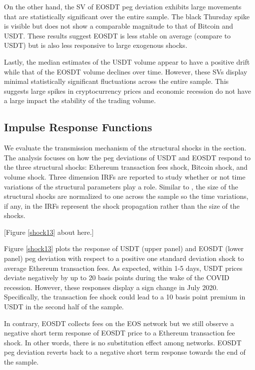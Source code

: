 \documentclass[12pt]{article}
\begin{document}
On the other hand, the SV of EOSDT peg deviation exhibits large movements that are statistically significant over the entire sample. The black Thursday spike is visible but does not show a comparable magnitude to that of Bitcoin and USDT. These results suggest EOSDT is less stable on average (compare to USDT) but is also less responsive to large exogenous shocks. 

Lastly, the median estimates of the USDT volume appear to have a positive drift while that of the EOSDT volume declines over time. However, these SVs display minimal statistically significant fluctuations across the entire sample. This suggests large spikes in cryptocurrency prices and economic recession do not have a large impact the stability of the trading volume. 



\subsection{Impulse Response Functions}
We evaluate the transmission mechanism of the structural shocks in the section. The analysis focuses on how the peg deviations of USDT and EOSDT respond to the three structural shocks: Ethereum transaction fees shock, Bitcoin shock, and volume shock. Three dimension IRFs are reported to study whether or not time variations of the structural parameters play a role. Similar to \cite{cfp}, the size of the structural shocks are normalized to one across the sample so the time variations, if any, in the IRFs represent the shock propagation rather than the size of the shocks. 


\begin{center}
	[Figure \ref{shock13} about here.]
\end{center}

Figure \ref{shock13} plots the response of USDT (upper panel) and EOSDT (lower panel) peg deviation with respect to a positive one standard deviation shock to average Ethereum transaction fees. As expected, within 1-5 days, USDT prices deviate negatively by up to 20 basis points during the wake of the COVID recession. However, these responses display a sign change in July 2020. Specifically, the transaction fee shock could lead to a 10 basis point premium in USDT in the second half of the sample.


In contrary, EOSDT collects fees on the EOS network but we still observe a negative short term response of EOSDT price to a Ethereum transaction fee shock. In other words, there is no substitution effect among networks. EOSDT peg deviation reverts back to a negative short term response towards the end of the sample. 
\end{document}
